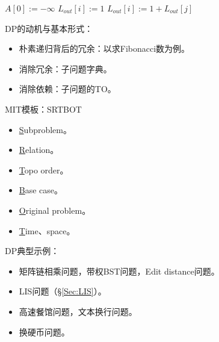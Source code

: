 \begin{algorithm}[htbp]
    \caption{($A[1..n]$)}
    \label{}
    \begin{algorithmic}[1]
        \State $A[0] := -\infty$
            \State $L_{out}[i] := 1$
                    \State $L_{out}[i] := 1+ L_{out}[j]$
                \EndIf
             \EndFor
        \EndFor
        \State {} 
    \end{algorithmic}
\end{algorithm}


%    
%    
%    
%       
%    
%    





\iffalse


\nin DP的动机与基本形式：
\begin{itemize}
    \item 朴素递归背后的冗余：以求Fibonacci数为例。
    \item 消除冗余：子问题字典。
    \item 消除依赖：子问题的TO。
\end{itemize}


\nin MIT模板：SRTBOT
\begin{itemize}
    \item \ul{S}ubproblem。
    \item \ul{R}elation。
    \item \ul{T}opo order。
    \item \ul{B}ase case。
    \item \ul{O}riginal problem。
    \item \ul{T}ime、space。
\end{itemize}


\nin DP典型示例：
\begin{itemize}
    \item 矩阵链相乘问题，带权BST问题，Edit distance问题。
    \item LIS问题（\S \ref{Sec:LIS}）。
    \item 高速餐馆问题，文本换行问题。
    \item 换硬币问题。
\end{itemize}

